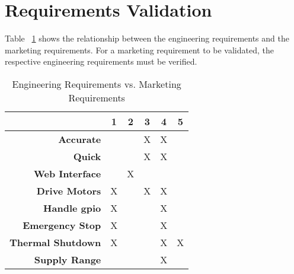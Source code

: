 \section{Requirements Validation}
Table ~\ref{table:validation} shows the relationship between the engineering requirements and the marketing requirements.
For a marketing requirement to be validated, the respective engineering requirements must be verified.

\begin{table}[H]
	\caption{Engineering Requirements vs. Marketing Requirements}
	\label{table:validation}
	\centering
	\begin{tabular}{|r |c |c |c |c |c|} 
		\hline\hline
		&1&2&3&4&5\\
		\hline
		\textbf{Accurate} &  & & X & X & \\
		\hline
		\textbf{Quick} &  & & X & X & \\
		\hline
		\textbf{Web Interface} & & X & & & \\
		\hline
		\textbf{Drive Motors} & X & & X & X & \\
		\hline
		\textbf{Handle \gls{gpio}} & X & & & X & \\
		\hline
		\textbf{Emergency Stop} & X & & & X & \\
		\hline
		\textbf{Thermal Shutdown } & X & & & X & X \\
		\hline
		\textbf{Supply Range} & & & & X & \\
	\hline 
	\end{tabular}
\end{table}
